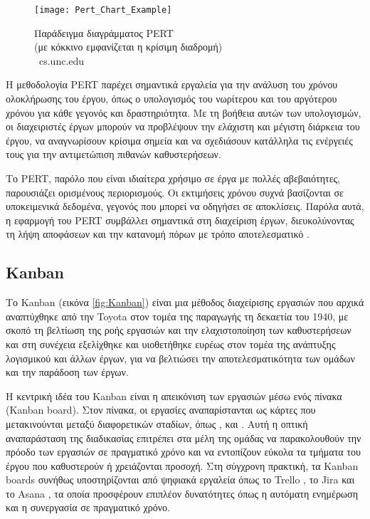             \begin{figure}[h!] \noindent \centering
                \texttt{[image: Pert\_Chart\_Example]}
                \caption{\centering Παράδειγμα διαγράμματος PERT \\ (με κόκκινο εμφανίζεται η κρίσιμη διαδρομή) \\ {\footnotesize \textcopyright\ cs.unc.edu}}
                \label{fig:PertChartExample}
            \end{figure}

            Η μεθοδολογία PERT παρέχει σημαντικά εργαλεία για την ανάλυση του χρόνου ολοκλήρωσης του έργου, όπως ο υπολογισμός του νωρίτερου και του αργότερου χρόνου για κάθε γεγονός και δραστηριότητα. Με τη βοήθεια αυτών των υπολογισμών, οι διαχειριστές έργων μπορούν να προβλέψουν την ελάχιστη και μέγιστη διάρκεια του έργου, να αναγνωρίσουν κρίσιμα σημεία και να σχεδιάσουν κατάλληλα τις ενέργειές τους για την αντιμετώπιση πιθανών καθυστερήσεων.

            Το PERT, παρόλο που είναι ιδιαίτερα χρήσιμο σε έργα με πολλές αβεβαιότητες, παρουσιάζει ορισμένους περιορισμούς. Οι εκτιμήσεις χρόνου συχνά βασίζονται σε υποκειμενικά δεδομένα, γεγονός που μπορεί να οδηγήσει σε αποκλίσεις. Παρόλα αυτά, η εφαρμογή του PERT συμβάλλει σημαντικά στη διαχείριση έργων, διευκολύνοντας τη λήψη αποφάσεων και την κατανομή πόρων με τρόπο αποτελεσματικό \cite{ProjectManagement21stCentury}.


        \subsection{Kanban} \label{subsec:Kanban}
            Το Kanban (εικόνα \ref{fig:Kanban}) είναι μια μέθοδος διαχείρισης εργασιών που αρχικά αναπτύχθηκε από την Toyota στον τομέα της παραγωγής τη δεκαετία του 1940, με σκοπό τη βελτίωση της ροής εργασιών και την ελαχιστοποίηση των καθυστερήσεων και στη συνέχεια εξελίχθηκε και υιοθετήθηκε ευρέως στον τομέα της ανάπτυξης λογισμικού και άλλων έργων, για να βελτιώσει την αποτελεσματικότητα των ομάδων και την παράδοση των έργων.

            Η κεντρική ιδέα του Kanban είναι η απεικόνιση των εργασιών μέσω ενός πίνακα (Kanban board). Στον πίνακα, οι εργασίες αναπαρίστανται ως κάρτες που μετακινούνται μεταξύ διαφορετικών σταδίων, όπως ,  και . Αυτή η οπτική αναπαράσταση της διαδικασίας επιτρέπει στα μέλη της ομάδας να παρακολουθούν την πρόοδο των εργασιών σε πραγματικό χρόνο και να εντοπίζουν εύκολα τα τμήματα του έργου που καθυστερούν ή χρειάζονται προσοχή. Στη σύγχρονη πρακτική, τα Kanban boards συνήθως υποστηρίζονται από ψηφιακά εργαλεία όπως το Trello \cite{Trello}, το Jira \cite{Jira} και το Asana \cite{Asana}, τα οποία προσφέρουν επιπλέον δυνατότητες όπως η αυτόματη ενημέρωση και η συνεργασία σε πραγματικό χρόνο.

